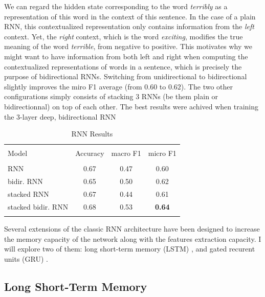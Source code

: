 \documentclass[final]{cvpr}
\begin{document}
We can regard the hidden state corresponding to the word \textit{terribly} as a representation of this word in the context of this sentence. In the case of a plain RNN, this contextualized representation only contains information from the \textit{left} context. Yet, the \textit{right} context, which is the word \textit{exciting}, modifies the true meaning of the word \textit{terrible}, from negative to positive. This motivates why we might want to have information from both left and right when computing the contextualized representations of words in a sentence, which is precisely the purpose of bidirectional RNNs. Switching from unidirectional to bidirectional slightly improves the miro F1 average (from $0.60$ to $0.62$). The two other configurations simply consists of stacking 3 RNNs (be them plain or bidirectionnal) on top of each other. The best results were achived when training the 3-layer deep, bidirectional RNN

\begin{table}[h!]
	\begin{center}
		\begin{tabular}{ l c c c  } 
			\hline
			\\ [-1.7mm] 
			Model & Accuracy & macro F1 & micro F1 \\ [0.7mm] 
			\hline
			\\ [-1.5mm] 
			RNN & 0.67 & 0.47 & 0.60 \\
			bidir. RNN & 0.65 & 0.50 & 0.62 \\
			stacked RNN & 0.67 & 0.44 & 0.61 \\
			stacked bidir. RNN & 0.68 & 0.53 & \textbf{0.64} \\ [0.5mm] 
			\hline
			\\ [-0.9mm] 
		\end{tabular}
		\caption{RNN Results}
		\label{tab:rnn}
	\end{center}
\end{table}

\vspace{-4mm}

Several extensions of the classic RNN architecture have been designed to increase the memory capacity of the network along with the features extraction capacity. I will explore two of them: long short-term memory (LSTM) \cite{lstm-original}, and gated recurent units (GRU) \cite{gru-original}.

\subsection{Long Short-Term Memory}
\end{document}
